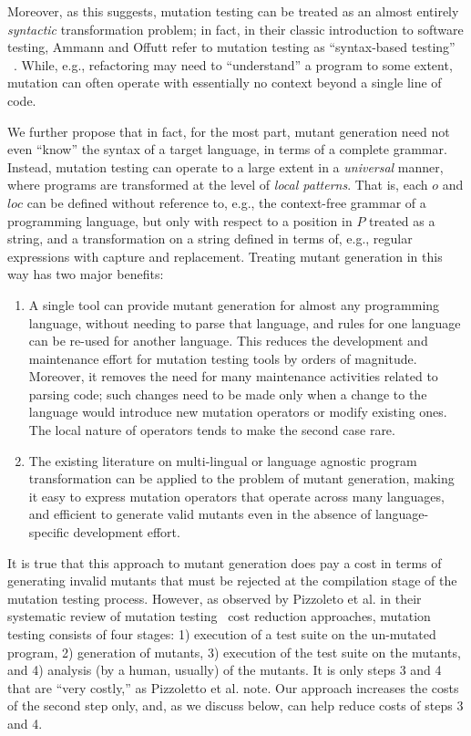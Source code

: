 \documentclass[acmsmall]{acmart}
\begin{document}
Moreover, as this suggests,
mutation testing can be treated as an almost entirely \emph{syntactic}
transformation problem; in fact, in their classic introduction to
software testing, Ammann and Offutt refer to mutation testing as
``syntax-based testing'' ~\cite{ammann2016introduction}.  While, e.g., refactoring may need to
``understand'' a program to some extent, mutation can often operate
with essentially no context beyond a single line of code.

We further propose that in fact, for the most part, mutant
generation need not even ``know'' the syntax of a target language, in
terms of a complete grammar.  Instead, mutation testing can operate to
a large extent in a \emph{universal} manner, where programs are
transformed at the level of \emph{local patterns}.  That is,
each $o$ and $loc$ can be defined without reference to, e.g., the
context-free grammar of a programming language, but only with respect
to a position in $P$ treated as a string, and a transformation on a
string defined in terms of, e.g., regular expressions with capture and
replacement.  Treating mutant generation in this way has two major benefits:

\begin{enumerate}
  \item A single tool can provide mutant generation for almost any
    programming language, without needing to parse that language, and
    rules for one language can be re-used for another language.  This
    reduces the development and maintenance effort for mutation
    testing tools by orders of magnitude.  Moreover, it removes the
    need for many   maintenance activities related to parsing code;
    such changes need to be made only when a change to the language
    would introduce new mutation operators or modify existing ones.
    The local nature of operators tends to make the second case rare.
    \item The existing literature on multi-lingual or language
      agnostic program transformation can be applied to the problem of
      mutant generation, making it easy to express mutation operators
      that operate across many languages, and efficient to generate
      valid mutants even in the absence of language-specific
      development effort.
      \end{enumerate}

It is true that this approach to mutant generation does pay a cost in
terms of generating invalid mutants that must be rejected at the
compilation stage of the mutation testing process.  However, as
observed by Pizzoleto et al. in their systematic review of mutation
testing~\cite{pizzoleto2019systematic} cost reduction approaches, mutation testing consists of four
stages: 1) execution of a test suite on the un-mutated program, 2)
generation of mutants, 3) execution of the test suite on the mutants,
and 4) analysis (by a human, usually) of the mutants.  It is only steps 3
and 4 that are ``very costly,'' as Pizzoletto et al. note.  Our approach increases the costs of
the second step only, and, as we discuss below, can help reduce
costs of steps 3 and 4.
      
\end{document}
